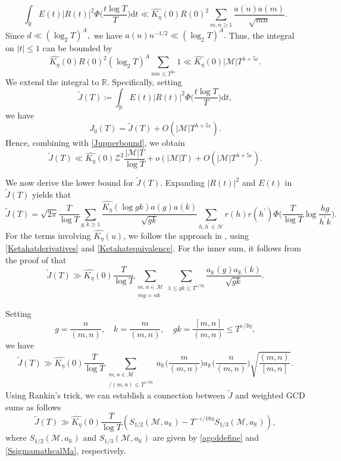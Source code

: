 \documentclass[12pt,reqno]{amsart}
\theoremstyle{definition}
\numberwithin{equation}{section}
\newcommand{\mbk}{\mathbb{K}}
\newcommand{\mbr}{\mathbb{R}}
\newcommand{\mch}{\mathcal{H}}
\newcommand{\mcm}{\mathcal{M}}
\newcommand{\mcz}{\mathcal{Z}}
\begin{document}
$$
\int_\mbr E(t)|R(t)|^2\Phi\Big(\frac{t\log T}{T} \Big)\mathrm{d}t \ll \widehat{K_\eta}(0)R(0)^2\sum_{m,n\ge1}\frac{a(n)a(m)}{\sqrt{mn}}.
$$
Since $d \ll (\log_2 T)^A,$ we have $a(n)n^{-1/2}\ll (\log_2 T)^A.$ Thus, the integral on $|t| \le1$ can be bounded by
$$
\widehat{K_{\eta}}(0)R(0)^2(\log_2 T)^A \sum_{mn\le T^{2\varepsilon}}1 \ll \widehat{K_{\eta}}(0)|\mcm|T^{\lambda + 5\varepsilon}.
$$
We extend the integral to $\mbr$. Specifically, setting
$$
\widetilde{J}(T)\coloneqq\int_\mbr E(t)|R(t)|^{2}\Phi\Big(\frac{t\log T}{T}\Big)\mathrm{d}t,
$$
we have
$$
J_0(T) = \widetilde{J}(T) + O(|\mcm|T^{\lambda + 5\varepsilon}).
$$
Hence, combining with \eqref{Jupperbound}, we obtain 
\begin{equation}
    \label{Jtuitaupperbound}
    \widetilde{J}(T) \ll  \widehat{K_{\eta}}(0) \mcz^2 \frac{|\mcm|T}{\log T} +  o(|\mcm| T) + O(|\mcm|T^{\lambda + 5\varepsilon}).
\end{equation}
\par
We now derive the lower bound for $\widetilde{J}(T)$. Expanding $|R(t)|^2$ and $E(t)$ in $\widetilde{J}(T)$ yields that 
$$
\widetilde{J}(T)=\sqrt{2\pi}\frac{T}{\log T}\sum_{g,k\geq1}\frac{\widehat{K_{\eta}}(\log gk)a(g)a(k)}{\sqrt{gk}}\sum_{h,h^{\prime}\in\mch}r(h)r(h^{\prime})\Phi\Big(\frac{T}{\log T}\log\frac{hg}{h^{\prime}k}\Big).
$$
For the terms involving $\widehat{K_{\eta}}(u)$, we follow the approach in \cite[p. 10]{bondarenko2023dichotomy}, using \eqref{Ketahatderivatives} and \eqref{Ketahatequivalence}.
For the inner sum, it follows from the proof of \cite[Theorem 1.4]{tenen2019galsum} that
$$
\widetilde{J}(T) \gg \widehat{K_{\eta}}(0)\frac{T}{\log T}\sum_{\substack{m,n\in\mcm \\  mg = nk}}\sum_{1\le gk\le T^{\varepsilon/3\eta}}\frac{a_\mbk(g)a_\mbk(k)}{\sqrt{gk}}.
$$
\par
Setting 
$$
g = \frac{n}{(m,n)}, \quad k = \frac{m}{(m,n)}, \quad gk = \frac{[m,n]}{(m,n)} \le T^{\varepsilon/3\eta},
$$
we have 
$$
\widetilde{J}(T) \gg \widehat{K_{\eta}}(0)\frac{T}{\log T}\sum_{\substack{m,n\in\mcm\\ [m,n]/(m,n)\le T^{\varepsilon/3\eta}}}a_\mbk\Big(\frac{m}{(m,n)}\Big)a_\mbk\Big(\frac{n}{(m,n)}\Big)\sqrt{\frac{(m,n)}{[m,n]}}.
$$
Using Rankin's trick, we can establish a connection between $\widetilde{J}$ and weighted GCD sums as follows
$$
\widetilde{J}(T)\gg \widehat{K_{\eta}}(0)\frac{T}{\log T}(S_{1/2}(\mcm, a_\mbk) - T^{-\varepsilon/18\eta}S_{1/3}(\mcm,a_\mbk)),
$$
where $S_{1/2}(\mcm,a_\mbk)$ and $S_{1/3}(\mcm,a_\mbk)$ are given by \eqref{agcddefine} and \eqref{SsigmamathcalMa}, respectively.
\end{document}
